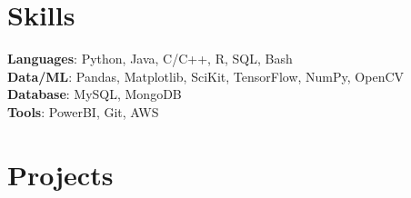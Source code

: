 \documentclass[letterpaper,11pt]{article}
\newcommand{\resumeSubHeadingListStart}{\begin{itemize}[leftmargin=0.15in, label={}]}
\newcommand{\resumeSubHeadingListEnd}{\end{itemize}}
\begin{document}


\section{Skills}
 \begin{itemize}[leftmargin=0.15in, label={}]
    \small{\item{
      \textbf{Languages}{: Python, Java, C/C++, R, SQL, Bash} \\
      \textbf{Data/ML}{: Pandas, Matplotlib, SciKit, TensorFlow, NumPy, OpenCV} \\
      \textbf{Database}{: MySQL, MongoDB} \\
      \textbf{Tools}{: PowerBI, Git, AWS} \\
    }}
 \end{itemize}





\section{Projects}
  \resumeSubHeadingListStart

  
  
  

  
  
  
  
  
  
  
  \resumeSubHeadingListEnd
  
% 


%





\end{document}
